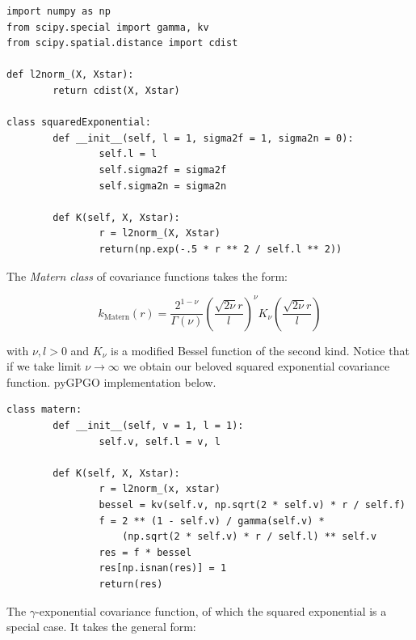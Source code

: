 \documentclass[10pt,a4paper,twoside]{book}
\begin{document}
\begin{verbatim}
import numpy as np
from scipy.special import gamma, kv
from scipy.spatial.distance import cdist

def l2norm_(X, Xstar):
        return cdist(X, Xstar)

class squaredExponential:
        def __init__(self, l = 1, sigma2f = 1, sigma2n = 0):
                self.l = l
                self.sigma2f = sigma2f
                self.sigma2n = sigma2n

        def K(self, X, Xstar):
                r = l2norm_(X, Xstar)
                return(np.exp(-.5 * r ** 2 / self.l ** 2))
\end{verbatim}

The \textit{Matern class} of covariance functions takes the form:

\begin{equation}
k_{\textrm{Matern}}(r) = \dfrac{2^{1-\nu}}{\Gamma(\nu)}\left(\dfrac{\sqrt{2\nu} r}{l}    \right)^\nu K_\nu\left( \dfrac{\sqrt{2\nu}r}{l} \right)
\end{equation}

with $\nu, l > 0$ and $K_\nu$ is a modified Bessel function of the second kind. Notice that if we take limit $\nu \rightarrow \infty$ we obtain our beloved squared exponential covariance function. pyGPGO implementation below.

\begin{verbatim}
class matern:
        def __init__(self, v = 1, l = 1):
                self.v, self.l = v, l

        def K(self, X, Xstar):
                r = l2norm_(x, xstar)
                bessel = kv(self.v, np.sqrt(2 * self.v) * r / self.f)
                f = 2 ** (1 - self.v) / gamma(self.v) * 
                	(np.sqrt(2 * self.v) * r / self.l) ** self.v
                res = f * bessel
                res[np.isnan(res)] = 1
                return(res)               
\end{verbatim}

The $\gamma$-exponential covariance function, of which the squared exponential is a special case. It takes the general form:
\end{document}
